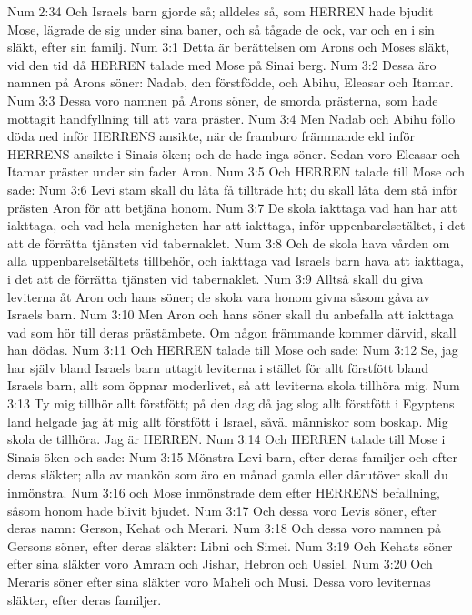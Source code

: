 Num 2:34  Och Israels barn gjorde så; alldeles så, som HERREN hade bjudit Mose, lägrade de sig under sina baner, och så tågade de ock, var och en i sin släkt, efter sin familj.
Num 3:1  Detta är berättelsen om Arons och Moses släkt, vid den tid då HERREN talade med Mose på Sinai berg.
Num 3:2  Dessa äro namnen på Arons söner: Nadab, den förstfödde, och Abihu, Eleasar och Itamar.
Num 3:3  Dessa voro namnen på Arons söner, de smorda prästerna, som hade mottagit handfyllning till att vara präster.
Num 3:4  Men Nadab och Abihu föllo döda ned inför HERRENS ansikte, när de framburo främmande eld inför HERRENS ansikte i Sinais öken; och de hade inga söner. Sedan voro Eleasar och Itamar präster under sin fader Aron.
Num 3:5  Och HERREN talade till Mose och sade:
Num 3:6  Levi stam skall du låta få tillträde hit; du skall låta dem stå inför prästen Aron för att betjäna honom.
Num 3:7  De skola iakttaga vad han har att iakttaga, och vad hela menigheten har att iakttaga, inför uppenbarelsetältet, i det att de förrätta tjänsten vid tabernaklet.
Num 3:8  Och de skola hava vården om alla uppenbarelsetältets tillbehör, och iakttaga vad Israels barn hava att iakttaga, i det att de förrätta tjänsten vid tabernaklet.
Num 3:9  Alltså skall du giva leviterna åt Aron och hans söner; de skola vara honom givna såsom gåva av Israels barn.
Num 3:10  Men Aron och hans söner skall du anbefalla att iakttaga vad som hör till deras prästämbete. Om någon främmande kommer därvid, skall han dödas.
Num 3:11  Och HERREN talade till Mose och sade:
Num 3:12  Se, jag har själv bland Israels barn uttagit leviterna i stället för allt förstfött bland Israels barn, allt som öppnar moderlivet, så att leviterna skola tillhöra mig.
Num 3:13  Ty mig tillhör allt förstfött; på den dag då jag slog allt förstfött i Egyptens land helgade jag åt mig allt förstfött i Israel, såväl människor som boskap. Mig skola de tillhöra. Jag är HERREN.
Num 3:14  Och HERREN talade till Mose i Sinais öken och sade:
Num 3:15  Mönstra Levi barn, efter deras familjer och efter deras släkter; alla av mankön som äro en månad gamla eller därutöver skall du inmönstra.
Num 3:16  och Mose inmönstrade dem efter HERRENS befallning, såsom honom hade blivit bjudet.
Num 3:17  Och dessa voro Levis söner, efter deras namn: Gerson, Kehat och Merari.
Num 3:18  Och dessa voro namnen på Gersons söner, efter deras släkter: Libni och Simei.
Num 3:19  Och Kehats söner efter sina släkter voro Amram och Jishar, Hebron och Ussiel.
Num 3:20  Och Meraris söner efter sina släkter voro Maheli och Musi. Dessa voro leviternas släkter, efter deras familjer.
